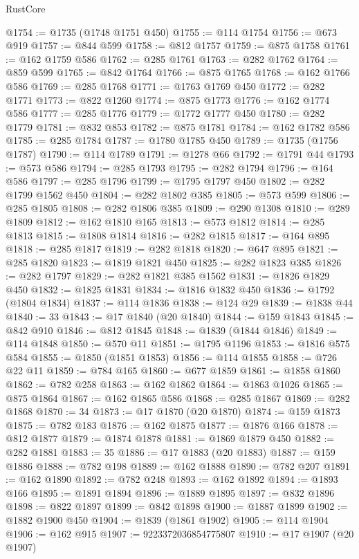 \begin{lexlean}{RustCore}
\begin{coremodule}
@1754 := @1735 (@1748 @1751 @450)
@1755 := @114 @1754
@1756 := @673 @919
@1757 := @844 @599
@1758 := @812 @1757
@1759 := @875 @1758
@1761 := @162 @1759 @586
@1762 := @285 @1761
@1763 := @282 @1762
@1764 := @859 @599
@1765 := @842 @1764
@1766 := @875 @1765
@1768 := @162 @1766 @586
@1769 := @285 @1768
@1771 := @1763 @1769 @450
@1772 := @282 @1771
@1773 := @822 @1260
@1774 := @875 @1773
@1776 := @162 @1774 @586
@1777 := @285 @1776
@1779 := @1772 @1777 @450
@1780 := @282 @1779
@1781 := @832 @853
@1782 := @875 @1781
@1784 := @162 @1782 @586
@1785 := @285 @1784
@1787 := @1780 @1785 @450
@1789 := @1735 (@1756 @1787)
@1790 := @114 @1789
@1791 := @1278 @66
@1792 := @1791 @44
@1793 := @573 @586
@1794 := @285 @1793
@1795 := @282 @1794
@1796 := @164 @586
@1797 := @285 @1796
@1799 := @1795 @1797 @450
@1802 := @282 @1799 @1562 @450
@1804 := @282 @1802 @385
@1805 := @573 @599
@1806 := @285 @1805
@1808 := @282 @1806 @385
@1809 := @290 @1308
@1810 := @289 @1809
@1812 := @162 @1810 @165
@1813 := @573 @1812
@1814 := @285 @1813
@1815 := @1808 @1814
@1816 := @282 @1815
@1817 := @164 @895
@1818 := @285 @1817
@1819 := @282 @1818
@1820 := @647 @895
@1821 := @285 @1820
@1823 := @1819 @1821 @450
@1825 := @282 @1823 @385
@1826 := @282 @1797
@1829 := @282 @1821 @385 @1562
@1831 := @1826 @1829 @450
@1832 := @1825 @1831
@1834 := @1816 @1832 @450
@1836 := @1792 (@1804 @1834)
@1837 := @114 @1836
@1838 := @124 @29
@1839 := @1838 @44
@1840 := 33
@1843 := @17 @1840 (@20 @1840)
@1844 := @159 @1843
@1845 := @842 @910
@1846 := @812 @1845
@1848 := @1839 (@1844 @1846)
@1849 := @114 @1848
@1850 := @570 @11
@1851 := @1795 @1196
@1853 := @1816 @575 @584
@1855 := @1850 (@1851 @1853)
@1856 := @114 @1855
@1858 := @726 @22 @11
@1859 := @784 @165
@1860 := @677 @1859
@1861 := @1858 @1860
@1862 := @782 @258
@1863 := @162 @1862
@1864 := @1863 @1026
@1865 := @875 @1864
@1867 := @162 @1865 @586
@1868 := @285 @1867
@1869 := @282 @1868
@1870 := 34
@1873 := @17 @1870 (@20 @1870)
@1874 := @159 @1873
@1875 := @782 @183
@1876 := @162 @1875
@1877 := @1876 @166
@1878 := @812 @1877
@1879 := @1874 @1878
@1881 := @1869 @1879 @450
@1882 := @282 @1881
@1883 := 35
@1886 := @17 @1883 (@20 @1883)
@1887 := @159 @1886
@1888 := @782 @198
@1889 := @162 @1888
@1890 := @782 @207
@1891 := @162 @1890
@1892 := @782 @248
@1893 := @162 @1892
@1894 := @1893 @166
@1895 := @1891 @1894
@1896 := @1889 @1895
@1897 := @832 @1896
@1898 := @822 @1897
@1899 := @842 @1898
@1900 := @1887 @1899
@1902 := @1882 @1900 @450
@1904 := @1839 (@1861 @1902)
@1905 := @114 @1904
@1906 := @162 @915
@1907 := 9223372036854775807
@1910 := @17 @1907 (@20 @1907)

\end{coremodule}
\end{lexlean}
